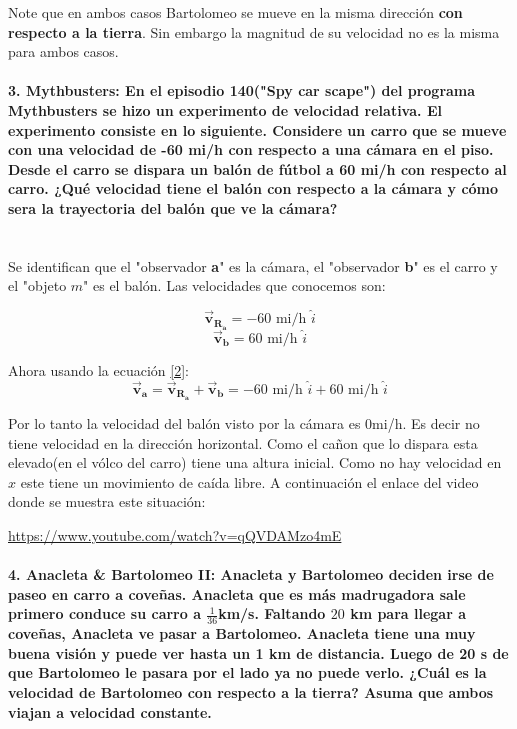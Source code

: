 \documentclass[a4paper,11pt]{article}
\theoremstyle{mytheor}
\begin{document}
Note que en ambos casos Bartolomeo se mueve en la misma dirección \textbf{con respecto a la tierra}. Sin embargo la magnitud de su velocidad no es la misma para ambos casos.


\paragraph{3. Mythbusters: En el episodio 140("Spy car scape") del programa Mythbusters se hizo un experimento de velocidad relativa. El experimento consiste en lo siguiente. Considere un carro que se mueve con una velocidad de -60 mi/h con respecto a una cámara en el piso. Desde el carro se dispara un balón de fútbol a 60 mi/h con respecto al carro. ¿Qué velocidad tiene el balón con respecto a la cámara y cómo sera la trayectoria del balón que ve la cámara?\\
	\\ }

Se identifican que el  "observador \textbf{a}" es la cámara, el  "observador \textbf{b}" es el carro y el  "objeto $m$" es el balón. Las velocidades que conocemos son:


$$ \vec{\textbf{v}}_{\textbf{R}_\textbf{a}} = -60 \text{ mi/h } \hat{i} $$
$$ \vec{\textbf{v}}_{\textbf{b}} = 60 \text{ mi/h } \hat{i}$$ 

Ahora usando la ecuación \ref{2}:
\begin{equation}
\vec{\textbf{v}}_{\textbf{a}} = \vec{\textbf{v}}_{\textbf{R}_\textbf{a}} + \vec{\textbf{v}}_{\textbf{b}} = -60 \text{ mi/h }\hat{i} + 60 \text{ mi/h } \hat{i}
\end{equation}

Por lo tanto la velocidad del balón visto por la cámara es $0 $mi/h. Es decir no tiene velocidad en la dirección horizontal. Como el cañon que lo dispara esta elevado(en el vólco del carro) tiene una altura inicial. Como no hay velocidad en $x$ este tiene un movimiento de caída libre. A continuación el enlace del video donde se muestra este situación:

\url{https://www.youtube.com/watch?v=qQVDAMzo4mE}


\paragraph{4. Anacleta \& Bartolomeo II: Anacleta y Bartolomeo deciden irse de paseo en carro a coveñas. Anacleta que es más madrugadora sale primero conduce su carro a $\frac{1}{36}$km/s. Faltando $20$ km para llegar a coveñas, Anacleta ve pasar a Bartolomeo. Anacleta tiene una muy buena visión y puede ver hasta un 1 km de distancia. Luego de 20 s de que Bartolomeo le pasara por el lado ya no puede verlo. ¿Cuál es la velocidad de Bartolomeo con respecto a la tierra? Asuma que ambos viajan a velocidad constante.\\
	\\	}
\end{document}
